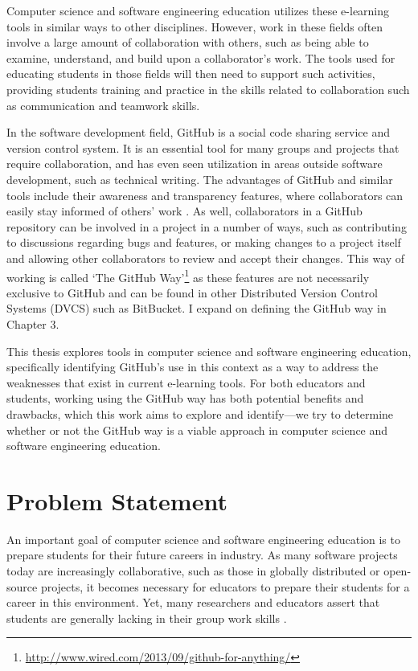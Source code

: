Computer science and software engineering education utilizes these e-learning tools in similar ways to other disciplines. However, work in these fields often involve a large amount of collaboration with others, such as being able to examine, understand, and build upon a collaborator's work. The tools used for educating students in those fields will then need to support such activities, providing students training and practice in the skills related to collaboration such as communication and teamwork skills.

In the software development field, GitHub is a social code sharing service and version control system. It is an essential tool for many groups and projects that require collaboration, and has even seen utilization in areas outside software development, such as technical writing. The advantages of GitHub and similar tools include their awareness and transparency features, where collaborators can easily stay informed of others' work \cite{dabbish2012social}. As well, collaborators in a GitHub repository can be involved in a project in a number of ways, such as contributing to discussions regarding bugs and features, or making changes to a project itself and allowing other collaborators to review and accept their changes. This way of working is called `The GitHub Way'\footnote{\url{http://www.wired.com/2013/09/github-for-anything/}} as these features are not necessarily exclusive to GitHub and can be found in other Distributed Version Control Systems (DVCS) such as BitBucket. I expand on defining the GitHub way in Chapter 3.

This thesis explores tools in computer science and software engineering education, specifically identifying GitHub's use in this context as a way to address the weaknesses that exist in current e-learning tools. For both educators and students, working using the GitHub way has both potential benefits and drawbacks, which this work aims to explore and identify---we try to determine whether or not the GitHub way is a viable approach in computer science and software engineering education.

\section{Problem Statement}
An important goal of computer science and software engineering education is to prepare students for their future careers in industry. As many software projects today are increasingly collaborative, such as those in globally distributed or open-source projects, it becomes necessary for educators to prepare their students for a career in this environment. Yet, many researchers and educators assert that students are generally lacking in their group work skills \cite{waite2004student}.

